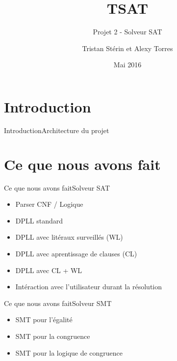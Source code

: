 \documentclass{beamer}
\title{TSAT}
\subtitle{Projet 2 - Solveur SAT}
\author{Tristan Stérin et Alexy Torres}
\institute{ENS Lyon}
\date{Mai 2016}
\begin{document}
    \begin{frame}
        \titlepage
    \end{frame}
    
    \frame{\tableofcontents}

    \section{Introduction}
        \begin{frame}{Introduction}{Architecture du projet}
        \end{frame}
        
    \section{Ce que nous avons fait}
        \begin{frame}{Ce que nous avons fait}{Solveur SAT}
            \begin{itemize}
                \item Parser CNF / Logique
                \item DPLL standard 
                \item DPLL avec litéraux surveillés (WL)
                \item DPLL avec aprentissage de clauses (CL)
                \item DPLL avec CL + WL
                \item Intéraction avec l'utilisateur durant la résolution
            \end{itemize}
        \end{frame}

        \begin{frame}{Ce que nous avons fait}{Solveur SMT}
            \begin{itemize}
                \item SMT pour l'égalité
                \item SMT pour la congruence
                \item SMT pour la logique de congruence
            \end{itemize}
        \end{frame}
\end{document}
